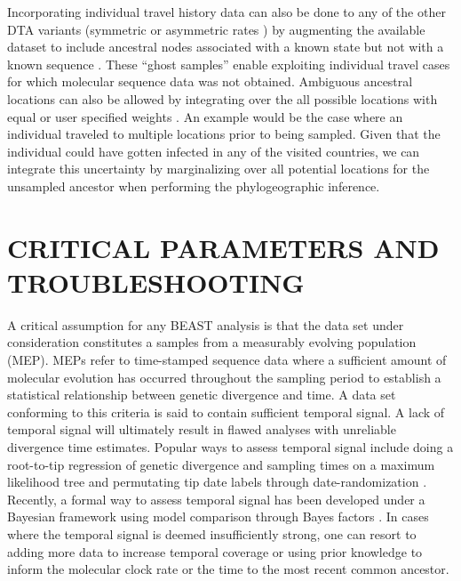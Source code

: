 \documentclass{article}
\begin{document}
\begin{multicols}{2}
Incorporating individual travel history data can also be done to any of the other DTA variants (symmetric or asymmetric rates \cite{dta}) %
by augmenting the available dataset to include ancestral nodes associated with a known state but not with a known sequence \cite{travhist}.
These ``ghost samples'' enable exploiting individual travel cases for which molecular sequence data was not obtained. %
Ambiguous ancestral locations can also be allowed by integrating over the all possible locations with equal or user specified weights \cite{ambig}. An example would be the case where an individual traveled to multiple locations prior to being sampled. Given that the individual could have gotten infected in any of the visited countries, we can integrate this uncertainty by marginalizing over all potential locations for the unsampled ancestor when performing the phylogeographic inference. %

\section*{CRITICAL PARAMETERS AND TROUBLESHOOTING}
A critical assumption for any BEAST analysis is that the data set under consideration constitutes a samples from a measurably evolving population (MEP). MEPs \cite{mep1,mep2} refer to time-stamped sequence data where a sufficient amount of molecular evolution has occurred throughout the sampling period to establish a statistical relationship between genetic divergence and time. A data set conforming to this criteria is said to contain sufficient temporal signal. A lack of temporal signal will ultimately result in flawed analyses with unreliable divergence time estimates. Popular ways to assess temporal signal include doing a root-to-tip regression of genetic divergence and sampling times on a maximum likelihood tree \cite{tempest} and permutating tip date labels through date-randomization \cite{tipdate}. Recently, a formal way to assess temporal signal has been developed under a Bayesian framework using model comparison through Bayes factors \cite{bets}. In cases where the temporal signal is deemed insufficiently strong, one can resort to adding more data to increase temporal coverage or using prior knowledge to inform the molecular clock rate or the time to the most recent common ancestor.


\end{multicols}
\end{document}
